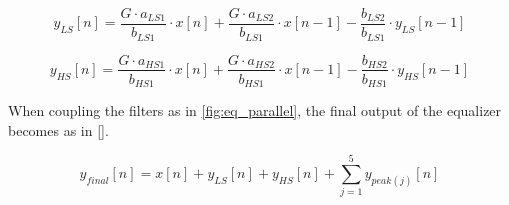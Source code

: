 \begin{equation}\label{eq:z_to_n_LS}
        y_{LS}[n] = \frac{G \cdot a_{LS1}}{b_{LS1}} \cdot x[n] + \frac{G \cdot a_{LS2}}{b_{LS1}} \cdot x[n-1] -  \frac{b_{LS2}}{b_{LS1}} \cdot y_{LS}[n-1]
    \end{equation}

\begin{equation}\label{eq:z_to_n_LS}
        y_{HS}[n] = \frac{G \cdot a_{HS1}}{b_{HS1}} \cdot x[n] + \frac{G \cdot a_{HS2}}{b_{HS1}} \cdot x[n-1] -  \frac{b_{HS2}}{b_{HS1}} \cdot y_{HS}[n-1]
    \end{equation}

When coupling the filters as in \autoref{fig:eq_parallel}, the final output of the equalizer becomes as in \autoref{}.

\begin{equation}\label{eq:z_to_n_LS}
        y_{final}[n] = x[n] + y_{LS}[n] + y_{HS}[n] + \sum_{j=1}^{5} y_{peak(j)}[n]
    \end{equation}



%
%
%
%
%
%
%
